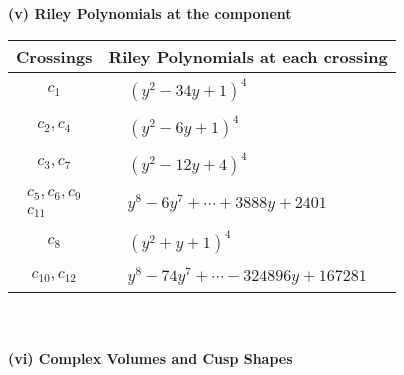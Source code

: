 \documentclass[1p]{elsarticle_modified}
\theoremstyle{definition}
\begin{document}
\newpage\renewcommand{\arraystretch}{1}
\flushleft \textbf{(v) Riley Polynomials at the component}\newline \\
\begin{tabular}{m{50pt}|m{274pt}}
Crossings & \hspace{64pt}Riley Polynomials at each crossing \\
\hline $$\begin{aligned}c_{1}\end{aligned}$$&$\begin{aligned}
&(y^2-34 y+1)^4
\end{aligned}$\\
\hline $$\begin{aligned}c_{2},c_{4}\end{aligned}$$&$\begin{aligned}
&(y^2-6 y+1)^4
\end{aligned}$\\
\hline $$\begin{aligned}c_{3},c_{7}\end{aligned}$$&$\begin{aligned}
&(y^2-12 y+4)^4
\end{aligned}$\\
\hline $$\begin{aligned}c_{5},c_{6},c_{9}\\c_{11}\end{aligned}$$&$\begin{aligned}
&y^8-6 y^7+\cdots+3888 y+2401
\end{aligned}$\\
\hline $$\begin{aligned}c_{8}\end{aligned}$$&$\begin{aligned}
&(y^2+y+1)^4
\end{aligned}$\\
\hline $$\begin{aligned}c_{10},c_{12}\end{aligned}$$&$\begin{aligned}
&y^8-74 y^7+\cdots-324896 y+167281
\end{aligned}$\\
\hline
\end{tabular}\\~\\
\newpage\flushleft \textbf{(vi) Complex Volumes and Cusp Shapes}
\end{document}

